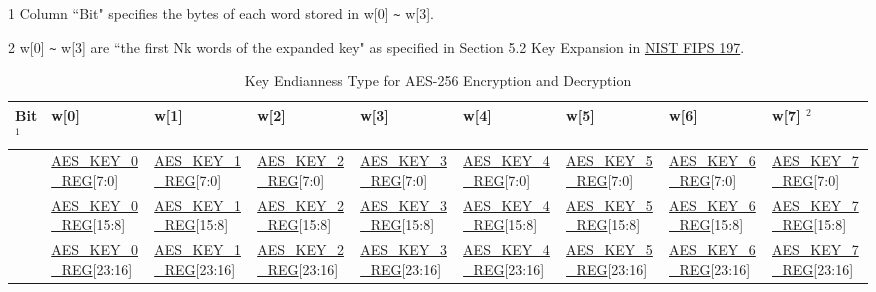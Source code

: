 \documentclass[main\_\_EN.tex]{subfiles}
\begin{document}
\begin{landscape}
\begin{table}[H]
\begin{threeparttable}
        \begin{tablenotes}
            \item[1] Column ``Bit" specifies the bytes of each word stored in w[0] \verb+~+ w[3].
            \item[2] w[0] \verb+~+ w[3] are ``the first Nk words of the expanded key" as specified in Section 5.2 Key Expansion in \href{https://nvlpubs.nist.gov/nistpubs/FIPS/NIST.FIPS.197.pdf}{NIST FIPS 197}.
        \end{tablenotes}
     \end{threeparttable}
\end{table}
    
    
\begin{ThreePartTable}

\begin{longtable}[c]
{ |l|l|l|l|l|l|l|l|l|}
\caption{Key Endianness Type for AES-256 Encryption and Decryption}\label{tab:aes-256-key-endian}\\
\hline 
\rowcolor{lightgray}
\textbf{Bit} $^1$ &   \textbf{w[0]}    &   \textbf{w[1]}    &   \textbf{w[2]}    &   \textbf{w[3]}    &   \textbf{w[4]}    &   \textbf{w[5]} &   \textbf{w[6]}    &   \textbf{w[7]} $^2$    \\\hline
[31:24]     &   \scriptsize \hyperref[regdesc:AESKEYnREG]{AES\_KEY\_0\_REG}[7:0]    &   \scriptsize \hyperref[regdesc:AESKEYnREG]{AES\_KEY\_1\_REG}[7:0]    &   \scriptsize \hyperref[regdesc:AESKEYnREG]{AES\_KEY\_2\_REG}[7:0]    &   \scriptsize \hyperref[regdesc:AESKEYnREG]{AES\_KEY\_3\_REG}[7:0]    &   \scriptsize \hyperref[regdesc:AESKEYnREG]{AES\_KEY\_4\_REG}[7:0]    &   \scriptsize \hyperref[regdesc:AESKEYnREG]{AES\_KEY\_5\_REG}[7:0]
& \scriptsize  \hyperref[regdesc:AESKEYnREG]{AES\_KEY\_6\_REG}[7:0]    &   \scriptsize \hyperref[regdesc:AESKEYnREG]{AES\_KEY\_7\_REG}[7:0]\\ \hline
[23:16]     &   \scriptsize \hyperref[regdesc:AESKEYnREG]{AES\_KEY\_0\_REG}[15:8]   &   \scriptsize \hyperref[regdesc:AESKEYnREG]{AES\_KEY\_1\_REG}[15:8]   &   \scriptsize \hyperref[regdesc:AESKEYnREG]{AES\_KEY\_2\_REG}[15:8]   &   \scriptsize \hyperref[regdesc:AESKEYnREG]{AES\_KEY\_3\_REG}[15:8]   &   \scriptsize \hyperref[regdesc:AESKEYnREG]{AES\_KEY\_4\_REG}[15:8]   &   \scriptsize \hyperref[regdesc:AESKEYnREG]{AES\_KEY\_5\_REG}[15:8]   &   \scriptsize \hyperref[regdesc:AESKEYnREG]{AES\_KEY\_6\_REG}[15:8]   &   \scriptsize \hyperref[regdesc:AESKEYnREG]{AES\_KEY\_7\_REG}[15:8]\\ \hline
[15:8]  &  \scriptsize \hyperref[regdesc:AESKEYnREG]{AES\_KEY\_0\_REG}[23:16]  &   \scriptsize \hyperref[regdesc:AESKEYnREG]{AES\_KEY\_1\_REG}[23:16]  &   \scriptsize \hyperref[regdesc:AESKEYnREG]{AES\_KEY\_2\_REG}[23:16]  &   \scriptsize \hyperref[regdesc:AESKEYnREG]{AES\_KEY\_3\_REG}[23:16]  &   \scriptsize \hyperref[regdesc:AESKEYnREG]{AES\_KEY\_4\_REG}[23:16]  &   \scriptsize \hyperref[regdesc:AESKEYnREG]{AES\_KEY\_5\_REG}[23:16]& \scriptsize \hyperref[regdesc:AESKEYnREG]{AES\_KEY\_6\_REG}[23:16]  &   \scriptsize \hyperref[regdesc:AESKEYnREG]{AES\_KEY\_7\_REG}[23:16]\\ \hline

\end{longtable}
\end{ThreePartTable}
\end{landscape}
\end{document}

